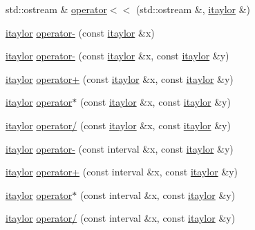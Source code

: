 \begin{DoxyCompactItemize}
\item 
std\-::ostream \& \hyperlink{classtaylor_1_1itaylor_ac07b19edfa7978a5fc4c65ce136216f8}{operator$<$$<$} (std\-::ostream \&, \hyperlink{classtaylor_1_1itaylor}{itaylor} \&)
\item 
\hyperlink{classtaylor_1_1itaylor}{itaylor} \hyperlink{classtaylor_1_1itaylor_afb753973c17006330c7c7418bc21f358}{operator-\/} (const \hyperlink{classtaylor_1_1itaylor}{itaylor} \&x)
\item 
\hyperlink{classtaylor_1_1itaylor}{itaylor} \hyperlink{classtaylor_1_1itaylor_a738113dbef62af2b3e5d02d81f0d80bf}{operator-\/} (const \hyperlink{classtaylor_1_1itaylor}{itaylor} \&x, const \hyperlink{classtaylor_1_1itaylor}{itaylor} \&y)
\item 
\hyperlink{classtaylor_1_1itaylor}{itaylor} \hyperlink{classtaylor_1_1itaylor_abf63631b6c3b32cd83ffaed31f8a68e1}{operator+} (const \hyperlink{classtaylor_1_1itaylor}{itaylor} \&x, const \hyperlink{classtaylor_1_1itaylor}{itaylor} \&y)
\item 
\hyperlink{classtaylor_1_1itaylor}{itaylor} \hyperlink{classtaylor_1_1itaylor_ab8e67cc898835ff637a15c47c428400f}{operator$\ast$} (const \hyperlink{classtaylor_1_1itaylor}{itaylor} \&x, const \hyperlink{classtaylor_1_1itaylor}{itaylor} \&y)
\item 
\hyperlink{classtaylor_1_1itaylor}{itaylor} \hyperlink{classtaylor_1_1itaylor_ad48cedc38c3108eed1beaeb1bc25e622}{operator/} (const \hyperlink{classtaylor_1_1itaylor}{itaylor} \&x, const \hyperlink{classtaylor_1_1itaylor}{itaylor} \&y)
\item 
\hyperlink{classtaylor_1_1itaylor}{itaylor} \hyperlink{classtaylor_1_1itaylor_a49d69b2639d8a8bf6ba301c8ee1c3bdb}{operator-\/} (const interval \&x, const \hyperlink{classtaylor_1_1itaylor}{itaylor} \&y)
\item 
\hyperlink{classtaylor_1_1itaylor}{itaylor} \hyperlink{classtaylor_1_1itaylor_a3b295df49a3e613a7ae367e70f5541c3}{operator+} (const interval \&x, const \hyperlink{classtaylor_1_1itaylor}{itaylor} \&y)
\item 
\hyperlink{classtaylor_1_1itaylor}{itaylor} \hyperlink{classtaylor_1_1itaylor_a1808edf7ebbeb846cda848363389ce94}{operator$\ast$} (const interval \&x, const \hyperlink{classtaylor_1_1itaylor}{itaylor} \&y)
\item 
\hyperlink{classtaylor_1_1itaylor}{itaylor} \hyperlink{classtaylor_1_1itaylor_a3327b8c63a96b31906c1882831aeea51}{operator/} (const interval \&x, const \hyperlink{classtaylor_1_1itaylor}{itaylor} \&y)
\item 

\end{DoxyCompactItemize}
